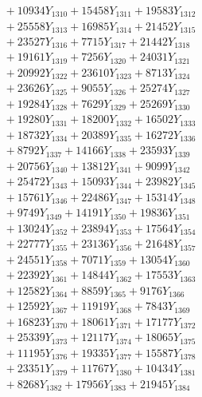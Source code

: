 \documentclass[a4paper,10pt]{article}
\begin{document}
{\begin{align}
&\;  + 10934 Y_{1310} + 15458 Y_{1311} + 19583 Y_{1312} \\[0.3ex]
&\;  + 25558 Y_{1313} + 16985 Y_{1314} + 21452 Y_{1315} \\[0.3ex]
&\;  + 23527 Y_{1316} + 7715 Y_{1317} + 21442 Y_{1318} \\[0.5ex]\allowbreak
&\;  + 19161 Y_{1319} + 7256 Y_{1320} + 24031 Y_{1321} \\[0.3ex]
&\;  + 20992 Y_{1322} + 23610 Y_{1323} + 8713 Y_{1324} \\[0.3ex]
&\;  + 23626 Y_{1325} + 9055 Y_{1326} + 25274 Y_{1327} \\[0.3ex]
&\;  + 19284 Y_{1328} + 7629 Y_{1329} + 25269 Y_{1330} \\[0.3ex]
&\;  + 19280 Y_{1331} + 18200 Y_{1332} + 16502 Y_{1333} \\[0.3ex]
&\;  + 18732 Y_{1334} + 20389 Y_{1335} + 16272 Y_{1336} \\[0.3ex]
&\;  + 8792 Y_{1337} + 14166 Y_{1338} + 23593 Y_{1339} \\[0.3ex]
&\;  + 20756 Y_{1340} + 13812 Y_{1341} + 9099 Y_{1342} \\[0.3ex]
&\;  + 25472 Y_{1343} + 15093 Y_{1344} + 23982 Y_{1345} \\[0.3ex]
&\;  + 15761 Y_{1346} + 22486 Y_{1347} + 15314 Y_{1348} \\[0.5ex]\allowbreak
&\;  + 9749 Y_{1349} + 14191 Y_{1350} + 19836 Y_{1351} \\[0.3ex]
&\;  + 13024 Y_{1352} + 23894 Y_{1353} + 17564 Y_{1354} \\[0.3ex]
&\;  + 22777 Y_{1355} + 23136 Y_{1356} + 21648 Y_{1357} \\[0.3ex]
&\;  + 24551 Y_{1358} + 7071 Y_{1359} + 13054 Y_{1360} \\[0.3ex]
&\;  + 22392 Y_{1361} + 14844 Y_{1362} + 17553 Y_{1363} \\[0.3ex]
&\;  + 12582 Y_{1364} + 8859 Y_{1365} + 9176 Y_{1366} \\[0.3ex]
&\;  + 12592 Y_{1367} + 11919 Y_{1368} + 7843 Y_{1369} \\[0.3ex]
&\;  + 16823 Y_{1370} + 18061 Y_{1371} + 17177 Y_{1372} \\[0.3ex]
&\;  + 25339 Y_{1373} + 12117 Y_{1374} + 18065 Y_{1375} \\[0.3ex]
&\;  + 11195 Y_{1376} + 19335 Y_{1377} + 15587 Y_{1378} \\[0.5ex]\allowbreak
&\;  + 23351 Y_{1379} + 11767 Y_{1380} + 10434 Y_{1381} \\[0.3ex]
&\;  + 8268 Y_{1382} + 17956 Y_{1383} + 21945 Y_{1384} \\[0.3ex]

\end{align}}
\end{document}
